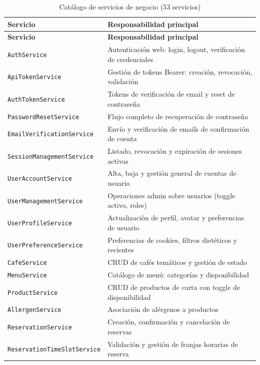 \documentclass[12pt,a4paper,twoside,openright]{report}
\begin{document}
\begin{longtable}{@{}lp{8cm}@{}}
  \caption{Catálogo de servicios de negocio (53 servicios)}
  \label{tab:servicios}\\
  \toprule
  \textbf{Servicio} & \textbf{Responsabilidad principal}\\
  \midrule
  \endfirsthead
  \toprule
  \textbf{Servicio} & \textbf{Responsabilidad principal}\\
  \midrule
  \endhead
  \bottomrule
  \endfoot
  \texttt{AuthService}                 & Autenticación web: login, logout, verificación de credenciales\\
  \texttt{ApiTokenService}             & Gestión de tokens Bearer: creación, revocación, validación\\
  \texttt{AuthTokenService}            & Tokens de verificación de email y reset de contraseña\\
  \texttt{PasswordResetService}        & Flujo completo de recuperación de contraseña\\
  \texttt{EmailVerificationService}    & Envío y verificación de emails de confirmación de cuenta\\
  \texttt{SessionManagementService}    & Listado, revocación y expiración de sesiones activas\\
  \texttt{UserAccountService}          & Alta, baja y gestión general de cuentas de usuario\\
  \texttt{UserManagementService}       & Operaciones admin sobre usuarios (toggle activo, roles)\\
  \texttt{UserProfileService}          & Actualización de perfil, avatar y preferencias de usuario\\
  \texttt{UserPreferenceService}       & Preferencias de cookies, filtros dietéticos y recientes\\
  \texttt{CafeService}                 & CRUD de cafés temáticos y gestión de estado\\
  \texttt{MenuService}                 & Catálogo de menú: categorías y disponibilidad\\
  \texttt{ProductService}              & CRUD de productos de carta con toggle de disponibilidad\\
  \texttt{AllergenService}             & Asociación de alérgenos a productos\\
  \texttt{ReservationService}          & Creación, confirmación y cancelación de reservas\\
  \texttt{ReservationTimeSlotService}  & Validación y gestión de franjas horarias de reserva\\

\end{longtable}
\end{document}
